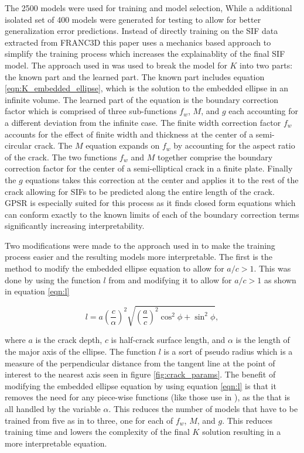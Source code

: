The 2500 models were used for training and model selection, While a additional isolated set of 400 models were generated for testing to allow for better generalization error predictions. Instead of directly training on the SIF data extracted from FRANC3D this paper uses a mechanics based approach to simplify the training process which increases the explainablity of the final SIF model. The approach used in \cite{RNeqnsbook} was used to break the model for $K$ into two parts: the known part and the learned part. The known part includes equation \ref{eqn:K_embedded_ellipse}, which is the solution to the embedded ellipse in an infinite volume. The learned part of the equation is the boundary correction factor which is comprised of three sub-functions $f_w$, $M$, and $g$ each accounting for a different deviation from the infinite case. The finite width correction factor $f_w$ accounts for the effect of finite width and thickness at the center of a semi-circular crack. The $M$ equation expands on $f_w$ by accounting for the aspect ratio of the crack. The two functions $f_w$ and $M$ together comprise the boundary correction factor for the center of a semi-elliptical crack in a finite plate. Finally the $g$ equations takes this correction at the center and applies it to the rest of the crack allowing for SIFs to be predicted along the entire length of the crack. GPSR is especially suited for this process as it finds closed form equations which can conform exactly to the known limits of each of the boundary correction terms significantly increasing interpretability.

Two modifications were made to the approach used in \cite{RNeqnsbook} to make the training process easier and the resulting models more interpretable. The first is the method to modify the embedded ellipse equation to allow for $a/c > 1$. This was done by using the function $l$ from \cite{tada1985} and modifying it to allow for  $a/c > 1$ as shown in equation \ref{eqn:l}


\begin{equation} \label{eqn:l}
l = a \left( \frac{c}{\alpha} \right)^2 \sqrt{\left( \frac{a}{c} \right)^2 \cos^2 \phi + \sin^2 \phi},
\end{equation}

where $a$ is the crack depth, $c$ is half-crack surface length, and $\alpha$ is the length of the major axis of the ellipse. The function $l$ is a sort of pseudo radius which is a measure of the perpendicular distance from the tangent line at the point of interest to the nearest axis seen in figure \ref{fig:crack_params}. The benefit of modifying the embedded ellipse equation by using equation \ref{eqn:l} is that it removes the need for any piece-wise functions (like those use in \cite{RNeqnsbook}), as the that is all handled by the variable $\alpha$. This reduces the number of models that have to be trained from five as in \cite{RNeqnsbook} to three, one for each of $f_w$, $M$, and $g$. This reduces training time and lowers the complexity of the final $K$ solution resulting in a more interpretable equation. 

